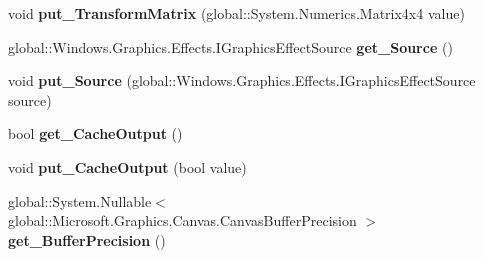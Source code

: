 \begin{DoxyCompactItemize}
\item 
\mbox{\label{class_microsoft_1_1_graphics_1_1_canvas_1_1_effects_1_1_transform3_d_effect_a1a29836c35514b1d6cf8834255c05da7}} 
void {\bfseries put\+\_\+\+Transform\+Matrix} (global\+::\+System.\+Numerics.\+Matrix4x4 value)
\item 
\mbox{\label{class_microsoft_1_1_graphics_1_1_canvas_1_1_effects_1_1_transform3_d_effect_aabf75189a0a2858c19e9e0c431ee3e81}} 
global\+::\+Windows.\+Graphics.\+Effects.\+I\+Graphics\+Effect\+Source {\bfseries get\+\_\+\+Source} ()
\item 
\mbox{\label{class_microsoft_1_1_graphics_1_1_canvas_1_1_effects_1_1_transform3_d_effect_a50774a6e92f54c773522cbc57e44ffbf}} 
void {\bfseries put\+\_\+\+Source} (global\+::\+Windows.\+Graphics.\+Effects.\+I\+Graphics\+Effect\+Source source)
\item 
\mbox{\label{class_microsoft_1_1_graphics_1_1_canvas_1_1_effects_1_1_transform3_d_effect_a6fd6a7212abf3fb015bcb55d184efbdf}} 
bool {\bfseries get\+\_\+\+Cache\+Output} ()
\item 
\mbox{\label{class_microsoft_1_1_graphics_1_1_canvas_1_1_effects_1_1_transform3_d_effect_a5f76a4f696cc8f4c885a255b03199352}} 
void {\bfseries put\+\_\+\+Cache\+Output} (bool value)
\item 
\mbox{\label{class_microsoft_1_1_graphics_1_1_canvas_1_1_effects_1_1_transform3_d_effect_aec5e314201704c1f1309e12ce3309775}} 
global\+::\+System.\+Nullable$<$ global\+::\+Microsoft.\+Graphics.\+Canvas.\+Canvas\+Buffer\+Precision $>$ {\bfseries get\+\_\+\+Buffer\+Precision} ()
\item 
\mbox{\label{class_microsoft_1_1_graphics_1_1_canvas_1_1_effects_1_1_transform3_d_effect_afb3c6369f40c4d52ad7ea9c6076fce2a}} 

\end{DoxyCompactItemize}
